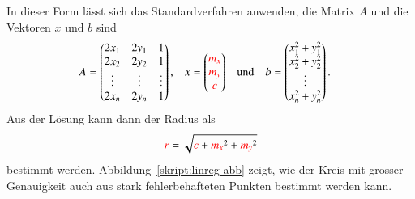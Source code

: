 In dieser Form lässt sich das Standardverfahren anwenden, die Matrix
$A$ und die Vektoren $x$ und $b$ sind
\begin{align*}
A
&=
\begin{pmatrix}
2x_1  & 2y_1 & 1    \\
2x_2  & 2y_2 & 1    \\
\vdots&\vdots&\vdots\\
2x_n  & 2y_n & 1    \\
\end{pmatrix},
&
x&=\begin{pmatrix}
{\color{red}m_x}\\
{\color{red}m_y}\\
{\color{red}c}
\end{pmatrix}
&&\text{und}&
b
&=
\begin{pmatrix}
x_1^2+y_1^2\\
x_2^2+y_2^2\\
\vdots\\
x_n^2+y_n^2
\end{pmatrix}.
\end{align*}
Aus der Lösung kann dann der Radius als 
\[
{\color{red}r}= 
\sqrt{
{\color{red}c}
+
{\color{red}m_x}^2
+
{\color{red}m_y}^2
}
\]
bestimmt werden.
Abbildung~\ref{skript:linreg-abb} zeigt, wie der Kreis mit grosser
Genauigkeit auch aus stark fehlerbehafteten Punkten bestimmt werden
kann.

